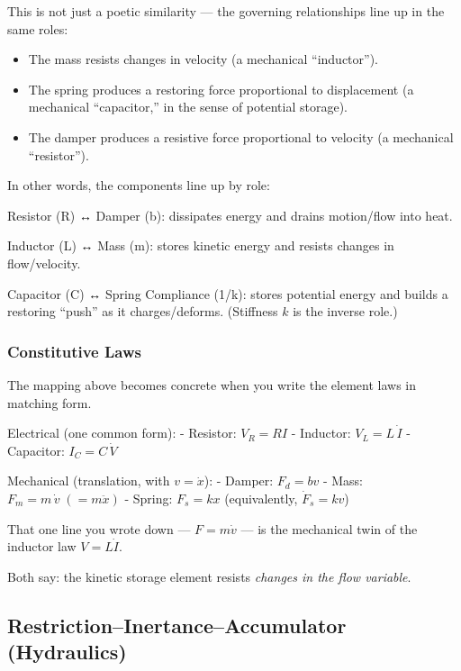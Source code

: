 \documentclass[
  letterpaper,
  DIV=11,
  numbers=noendperiod]{scrartcl}
\providecommand{\tightlist}{%
  \setlength{\itemsep}{0pt}\setlength{\parskip}{0pt}}
\begin{document}
This is not just a poetic similarity --- the governing relationships
line up in the same roles:

\begin{itemize}
\tightlist
\item
  The mass resists changes in velocity (a mechanical ``inductor'').
\item
  The spring produces a restoring force proportional to displacement (a
  mechanical ``capacitor,'' in the sense of potential storage).
\item
  The damper produces a resistive force proportional to velocity (a
  mechanical ``resistor'').
\end{itemize}

In other words, the components line up by role:

Resistor (R) ↔ Damper (b): dissipates energy and drains motion/flow into
heat.

Inductor (L) ↔ Mass (m): stores kinetic energy and resists changes in
flow/velocity.

Capacitor (C) ↔ Spring Compliance (1/k): stores potential energy and
builds a restoring ``push'' as it charges/deforms. (Stiffness \(k\) is
the inverse role.)

\subsubsection{Constitutive Laws}\label{constitutive-laws}

The mapping above becomes concrete when you write the element laws in
matching form.

Electrical (one common form): - Resistor: \(V_R = R I\) - Inductor:
\(V_L = L\,\dot I\) - Capacitor: \(I_C = C\,\dot V\)

Mechanical (translation, with \(v=\dot x\)): - Damper: \(F_d = b v\) -
Mass: \(F_m = m\,\dot v \; (= m\ddot x)\) - Spring: \(F_s = kx\)
(equivalently, \(\dot F_s = k v\))

That one line you wrote down --- \(F = m\dot v\) --- is the mechanical
twin of the inductor law \(V = L\dot I\).

Both say: the kinetic storage element resists \emph{changes in the flow
variable}.

\subsection{Restriction--Inertance--Accumulator
(Hydraulics)}\label{restrictioninertanceaccumulator-hydraulics}
\end{document}
